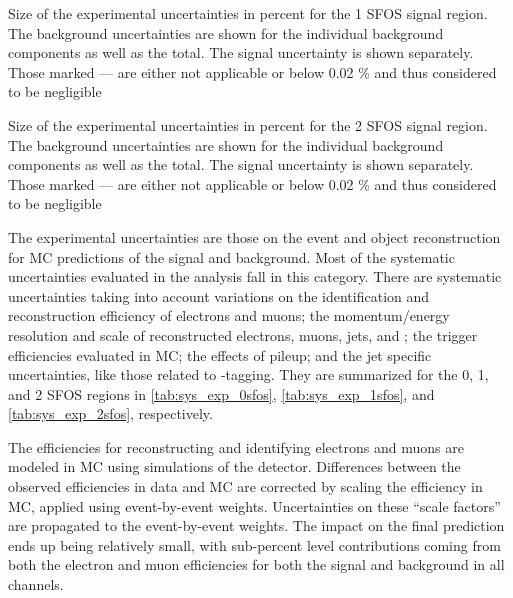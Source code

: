 \begin{table}[ht!]
\centering

\caption{Size of the experimental uncertainties in percent for the 1 SFOS signal region. The background uncertainties are shown for the individual background components as well as the total. The signal uncertainty is shown separately. Those marked --- are either not applicable or below 0.02 \% and thus considered to be negligible}
\label{tab:sys_exp_1sfos}
\end{table}

\begin{table}[ht!]
\centering

\caption{Size of the experimental uncertainties in percent for the 2 SFOS signal region. The background uncertainties are shown for the individual background components as well as the total. The signal uncertainty is shown separately. Those marked --- are either not applicable or below 0.02 \% and thus considered to be negligible}
\label{tab:sys_exp_2sfos}
\end{table}
The experimental uncertainties are those on the event and object
reconstruction for MC predictions of  the signal
and background.
Most of the systematic uncertainties evaluated in the analysis
fall in this category.
There are systematic uncertainties taking into account variations
on the identification and reconstruction
efficiency of electrons and muons; 
the momentum/energy resolution and scale of reconstructed electrons, muons,
jets, and \MET; the trigger
efficiencies evaluated in MC; the effects of pileup; and the jet 
specific uncertainties, like those related to \bee-tagging.
They are summarized for the 0, 1, and 2 SFOS regions
in \tab\ref{tab:sys_exp_0sfos}, 
\tab\ref{tab:sys_exp_1sfos}, and
\tab\ref{tab:sys_exp_2sfos}, respectively.

The efficiencies for reconstructing and identifying electrons and muons
are modeled in MC using simulations of the detector. Differences
between the observed efficiencies in data and MC are corrected by scaling
the efficiency in MC, applied using event-by-event weights. 
Uncertainties on these ``scale factors'' are propagated to the event-by-event
weights.  The impact on the final prediction ends up being relatively
small, with sub-percent level contributions coming from both the electron
and muon efficiencies for both the signal and background in all channels.


